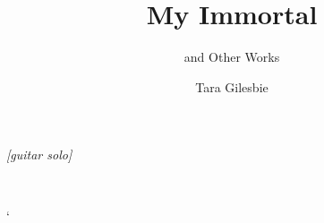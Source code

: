\documentclass[2020/08/28 v2]{fanfic_book}
\title{My Immortal}
\subtitle{and Other Works}
\author{Tara Gilesbie}
\date{\DTMusedate{date}}
\begin{document}
\maketitle
\frontmatter
\tableofcontents



\cleardoublepage\chapter*{}
\renewcommand{\epigraphflush}{center}\epigraph{\centering\emph{[guitar solo]}}{\centering{}\\\citeauthor{MCR-black_parade-dead}}
\mainmatter
\begingroup\let\clearpage\bigskip
{
	\sfcode`













































}
\endgroup
\cleardoublepage
\begingroup\let\clearpage\bigskip
\cleardoublepage





\endgroup
\cleardoublepage
\begingroup\let\clearpage\bigskip
\cleardoublepage

\endgroup
\end{document}
